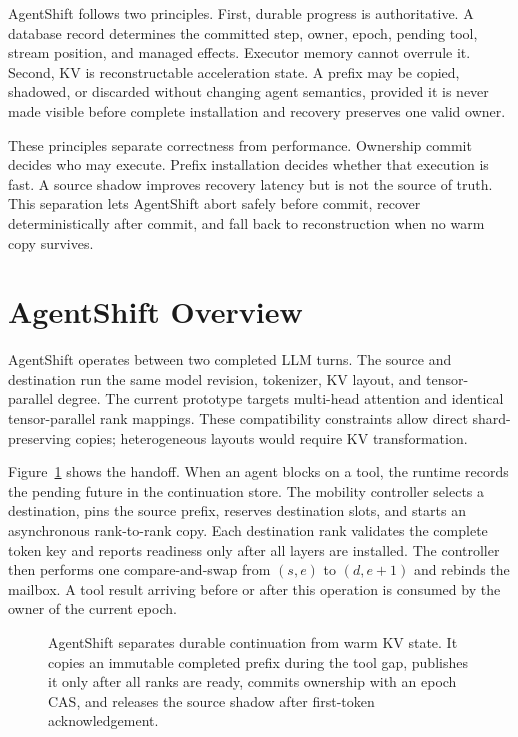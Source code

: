 AgentShift follows two principles. First, durable progress is authoritative. A database record determines the committed step, owner, epoch, pending tool, stream position, and managed effects. Executor memory cannot overrule it. Second, KV is reconstructable acceleration state. A prefix may be copied, shadowed, or discarded without changing agent semantics, provided it is never made visible before complete installation and recovery preserves one valid owner.

These principles separate correctness from performance. Ownership commit decides who may execute. Prefix installation decides whether that execution is fast. A source shadow improves recovery latency but is not the source of truth. This separation lets AgentShift abort safely before commit, recover deterministically after commit, and fall back to reconstruction when no warm copy survives.

\section{AgentShift Overview}\label{agentshift-overview}

AgentShift operates between two completed LLM turns. The source and destination run the same model revision, tokenizer, KV layout, and tensor-parallel degree. The current prototype targets multi-head attention and identical tensor-parallel rank mappings. These compatibility constraints allow direct shard-preserving copies; heterogeneous layouts would require KV transformation.

Figure~\ref{fig:architecture} shows the handoff. When an agent blocks on a tool, the runtime records the pending future in the continuation store. The mobility controller selects a destination, pins the source prefix, reserves destination slots, and starts an asynchronous rank-to-rank copy. Each destination rank validates the complete token key and reports readiness only after all layers are installed. The controller then performs one compare-and-swap from \((s,e)\) to \((d,e+1)\) and rebinds the mailbox. A tool result arriving before or after this operation is consumed by the owner of the current epoch.

\begin{figure}[t]
  \centering
  \caption{AgentShift separates durable continuation from warm KV state. It copies an immutable completed prefix during the tool gap, publishes it only after all ranks are ready, commits ownership with an epoch CAS, and releases the source shadow after first-token acknowledgement.}
  \label{fig:architecture}
\end{figure}

